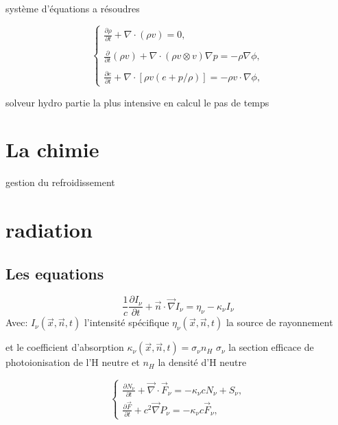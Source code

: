 système d'équations a résoudres

\begin{equation}
\begin{cases}

{ \frac{ \partial \rho }{ \partial t } + \nabla \cdot (\rho v) = 0}, \\
\\
{ \frac{ \partial }{ \partial t } (\rho v) + \nabla \cdot (\rho v \otimes v ) \nabla p = -\rho\nabla \phi }, \\
\\
{ \frac{ \partial e }{ \partial t } + \nabla \cdot [ \rho v (e+p/\rho) ] = -\rho v \cdot \nabla \phi },

\end{cases}
\end{equation}
\label{eq:hydro}



solveur hydro
partie la plus intensive en calcul
le pas de temps

\section{La chimie}

gestion du refroidissement

\section{radiation}

\subsection{Les equations}
\begin{equation}
\frac{1}{c} \frac{\partial I_\nu}{\partial t} + \vec{n}\cdot \vec{\nabla} I_\nu = \eta_\nu - \kappa_\nu I_\nu 
\end{equation}
Avec: $I_\nu(\vec{x},\vec{n},t)$ l'intensité spécifique
$\eta_\nu(\vec{x},\vec{n},t)$ la source de rayonnement

et le coefficient d'absorption $\kappa_\nu(\vec{x},\vec{n},t) = \sigma_\nu n_H$ 
$\sigma_\nu$ la section efficace de photoionisation de l'H neutre et $n_H$ la densité d'H neutre


\begin{equation}
\begin{cases}

\frac{ \partial N_\nu }{ \partial t } + \vec{\nabla} \cdot \vec{F}_\nu = -\kappa_\nu c  N_\nu + S_\nu,\\

\frac{ \partial \vec{F} }{ \partial t } + c^2 \vec{\nabla} P_\nu = -\kappa_\nu c \vec{F}_\nu ,

\end{cases}
\label{eq:densite_energie}
\end{equation}

